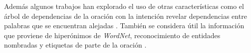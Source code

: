 Además algunos trabajos han explorado el uso de otras características como el árbol de dependencias de la oración con la intención revelar dependencias entre palabras que se encuentran alejadas \cite{xu2015classifyingLSTMandSDP, xu2015semantic}.  También se considera útil la información que proviene de hiperónimos de \textit{WordNet}, reconocimiento de entidades nombradas y etiquetas de parte de la oración \cite{zhang2015bidirectional, xu2015classifyingLSTMandSDP}.


%

%

%



